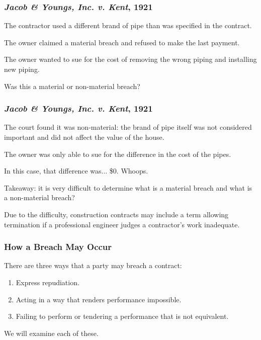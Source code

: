 \begin{frame}
\frametitle{\textit{Jacob \& Youngs, Inc. v. Kent}, 1921}

The contractor used a different brand of pipe than was specified in the contract.

The owner claimed a material breach and refused to make the last payment.

The owner wanted to sue for the cost of removing the wrong piping and installing new piping.

Was this a material or non-material breach?

\end{frame}



\begin{frame}
\frametitle{\textit{Jacob \& Youngs, Inc. v. Kent}, 1921}

The court found it was non-material: the brand of pipe itself was not considered important and did not affect the value of the house.

The owner was only able to sue for the difference in the cost of the pipes.

In this case, that difference was... \$0. Whoops.

Takeaway: it is very difficult to determine what is a material breach and what is a non-material breach?

Due to the difficulty, construction contracts may include a term allowing termination if a professional engineer judges a contractor's work inadequate.

\end{frame}



\begin{frame}
\frametitle{How a Breach May Occur}

There are three ways that a party may breach a contract:

\begin{enumerate}
	\item Express repudiation.
	\item Acting in a way that renders performance impossible.
	\item Failing to perform or tendering a performance that is not equivalent.
\end{enumerate}

We will examine each of these.

\end{frame}



